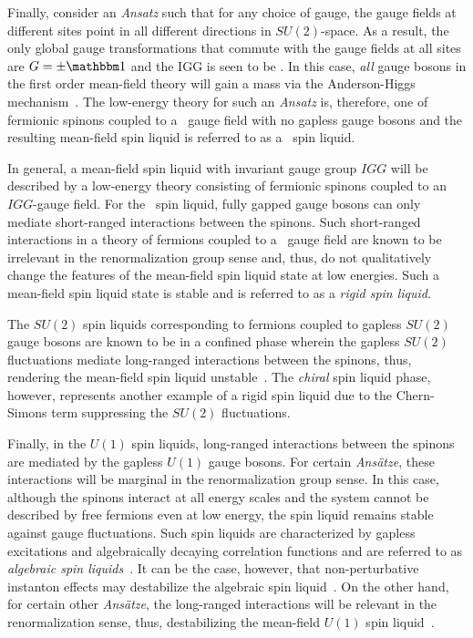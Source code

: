 Finally, consider an \textit{Ansatz} such that for any choice of gauge, the gauge fields at different sites point in all different directions in $SU(2)$-space.
As a result, the only global gauge transformations that commute with the gauge fields at all sites are $G = \pm \id$ and the IGG is seen to be \ZZ.
In this case, \textit{all} gauge bosons in the first order mean-field theory will gain a mass via the Anderson-Higgs mechanism~\cite{WenPRB1991,WenPRB2002,Wen2004}.
The low-energy theory for such an \textit{Ansatz} is, therefore, one of fermionic spinons coupled to a \ZZ~gauge field with no gapless gauge bosons and the resulting mean-field spin liquid is referred to as a \ZZ~spin liquid.

In general, a mean-field spin liquid with invariant gauge group $IGG$ will be described by a low-energy theory consisting of fermionic spinons coupled to an $IGG$-gauge field.
For the \ZZ~spin liquid, fully gapped gauge bosons can only mediate short-ranged interactions between the spinons.
Such short-ranged interactions in a theory of fermions coupled to a \ZZ~gauge field are known to be irrelevant in the renormalization group sense and, thus, do not qualitatively change the features of the mean-field spin liquid state at low energies.
Such a mean-field spin liquid state is stable and is referred to as a \textit{rigid spin liquid}.

The $SU(2)$ spin liquids corresponding to fermions coupled to gapless $SU(2)$ gauge bosons are known to be in a confined phase wherein the gapless $SU(2)$ fluctuations mediate long-ranged interactions between the spinons, thus, rendering the mean-field spin liquid unstable~\cite{WenPRB2002,Wen2004}.
The \textit{chiral} spin liquid phase, however, represents another example of a rigid spin liquid due to the Chern-Simons term suppressing the $SU(2)$ fluctuations.

Finally, in the $U(1)$ spin liquids, long-ranged interactions between the spinons are mediated by the gapless $U(1)$ gauge bosons.
For certain \textit{Ans\"atze}, these interactions will be marginal in the renormalization group sense.
In this case, although the spinons interact at all energy scales and the system cannot be described by free fermions even at low energy, the spin liquid remains stable against gauge fluctuations.
Such spin liquids are characterized by gapless excitations and algebraically decaying correlation functions and are referred to as \textit{algebraic spin liquids}~\cite{RantnerPRL2001}.
It can be the case, however, that non-perturbative instanton effects may destabilize the algebraic spin liquid~\cite{IoffePRB1989}.
On the other hand, for certain other \textit{Ans\"atze}, the long-ranged interactions will be relevant in the renormalization sense, thus, destabilizing the mean-field $U(1)$ spin liquid~\cite{WenPRB2002}.


